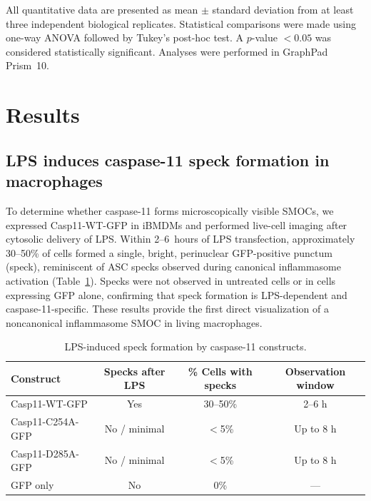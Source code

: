 \documentclass[11pt,a4paper]{article}
\begin{document}
All quantitative data are presented as mean $\pm$ standard deviation from at least three independent biological replicates. Statistical comparisons were made using one-way ANOVA followed by Tukey's post-hoc test. A $p$-value $<0.05$ was considered statistically significant. Analyses were performed in GraphPad Prism~10.

\section{Results}
\label{sec:results}

\subsection{LPS induces caspase-11 speck formation in macrophages}

To determine whether caspase-11 forms microscopically visible SMOCs, we expressed Casp11-WT-GFP in iBMDMs and performed live-cell imaging after cytosolic delivery of LPS. Within 2--6~hours of LPS transfection, approximately 30--50\% of cells formed a single, bright, perinuclear GFP-positive punctum (speck), reminiscent of ASC specks observed during canonical inflammasome activation (Table~\ref{tab:specks}). Specks were not observed in untreated cells or in cells expressing GFP alone, confirming that speck formation is LPS-dependent and caspase-11-specific. These results provide the first direct visualization of a noncanonical inflammasome SMOC in living macrophages.

\begin{table}[htbp]
\centering
\caption{LPS-induced speck formation by caspase-11 constructs.}
\label{tab:specks}
\begin{tabular}{@{}lccc@{}}
\toprule
\textbf{Construct} & \textbf{Specks after LPS} & \textbf{\% Cells with specks} & \textbf{Observation window} \\
\midrule
Casp11-WT-GFP      & Yes             & 30--50\% & 2--6 h \\
Casp11-C254A-GFP   & No / minimal    & $<$5\%   & Up to 8 h \\
Casp11-D285A-GFP   & No / minimal    & $<$5\%   & Up to 8 h \\
GFP only            & No              & 0\%      & --- \\
\bottomrule
\end{tabular}
\end{table}
\end{document}
